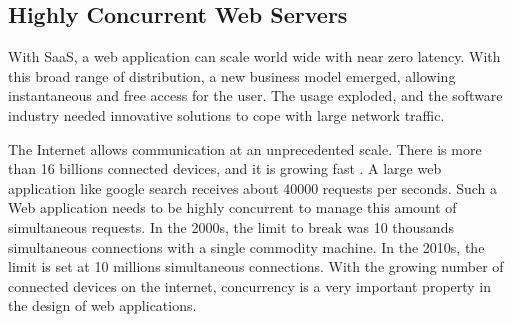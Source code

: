 

\subsection{Highly Concurrent Web Servers}

With SaaS, a web application can scale world wide with near zero latency. %
With this broad range of distribution, a new business model emerged, allowing instantaneous and free access for the user.
The usage exploded, and the software industry needed innovative solutions to cope with large network traffic.



The Internet allows communication at an unprecedented scale.
There is more than 16 billions connected devices, and it is growing fast \cite{Hilbert2011}.
A large web application like google search receives about \num{40000} requests per seconds.
Such a Web application needs to be highly concurrent to manage this amount of simultaneous requests.
In the 2000s, the limit to break was 10 thousands simultaneous connections with a single commodity machine.
In the 2010s, the limit is set at 10 millions simultaneous connections.
With the growing number of connected devices on the internet, concurrency is a very important property in the design of web applications.

